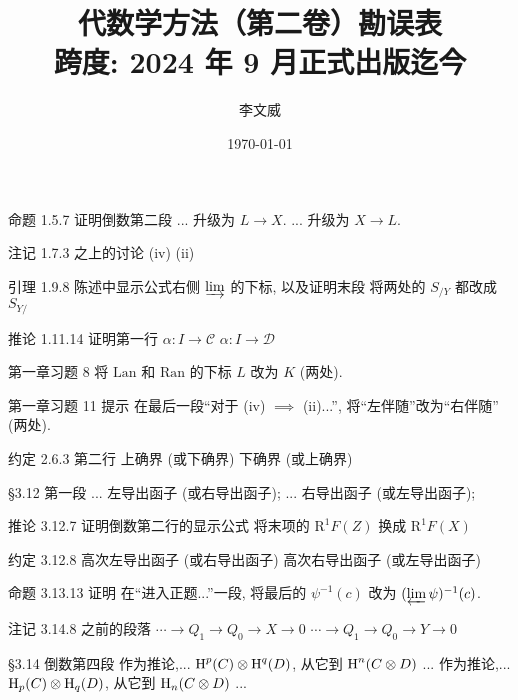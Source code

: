 \documentclass{AJerrata}
\title{\bfseries 代数学方法（第二卷）勘误表 \\ 跨度: 2024 年 9 月正式出版迄今 }
\author{李文威}
\date{\today}
\begin{document}
	\maketitle

	\begin{Errata}
		\item[命题 1.5.7 证明倒数第二段]
		\Orig ... 升级为 $L \to X$.
		\Corr ... 升级为 $X \to L$.
		
		\item[注记 1.7.3 之上的讨论]
		\Orig (iv)
		\Corr (ii)
		
		\item[引理 1.9.8 陈述中显示公式右侧 $\varinjlim$ 的下标, 以及证明末段]
		将两处的 $S_{/Y}$ 都改成 $S_{Y/}$
		
		\item[推论 1.11.14 证明第一行]
		\Orig $\alpha: I \to \mathcal{C}$
		\Corr $\alpha: I \to \mathcal{D}$
		
		\item[第一章习题 8]
		将 $\mathrm{Lan}$ 和 $\mathrm{Ran}$ 的下标 $L$ 改为 $K$ (两处).
		
		\item[第一章习题 11 提示] 在最后一段``对于 (iv) $\implies$ (ii)...'', 将``左伴随''改为``右伴随'' (两处).
		
		\item[约定 2.6.3 第二行]
		\Orig 上确界 (或下确界)
		\Corr 下确界 (或上确界)
		
		\item[\S 3.12 第一段]
		\Orig ... 左导出函子 (或右导出函子);
		\Corr ... 右导出函子 (或左导出函子);
		
		\item[推论 3.12.7 证明倒数第二行的显示公式]
		将末项的 $\mathrm{R}^1 F(Z)$ 换成 $\mathrm{R}^1 F(X)$
		
		\item[约定 3.12.8]
		\Orig 高次左导出函子 (或右导出函子)
		\Corr 高次右导出函子 (或左导出函子)
		
		\item[命题 3.13.13 证明]
		在``进入正题...''一段, 将最后的 $\psi^{-1}(c)$ 改为 $(\varprojlim \psi)^{-1}(c)$.
		
		\item[注记 3.14.8 之前的段落]
		\Orig $\cdots \to Q_1 \to Q_0 \to X \to 0$
		\Corr $\cdots \to Q_1 \to Q_0 \to Y \to 0$
		
		\item[\S 3.14 倒数第四段]
		\Orig 作为推论,... $\operatorname{H}^p(C) \otimes \operatorname{H}^q(D)$, 从它到 $\operatorname{H}^n(C \otimes D)$ ...
		\Corr 作为推论,... $\operatorname{H}_p(C) \otimes \operatorname{H}_q(D)$, 从它到 $\operatorname{H}_n(C \otimes D)$ ...
		

\end{Errata}
\end{document}
